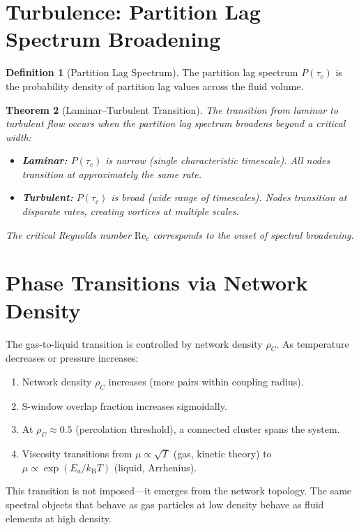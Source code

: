 \documentclass[twocolumn,10pt,a4paper]{article}
\theoremstyle{plain}
\newtheorem{theorem}{Theorem}[section]
\theoremstyle{definition}
\newtheorem{definition}[theorem]{Definition}
\theoremstyle{remark}
\newcommand{\kB}{k_{\mathrm{B}}}
\newcommand{\tauc}{\tau_c}
\begin{document}
\section{Turbulence: Partition Lag Spectrum Broadening}
\label{sec:turbulence}

\begin{definition}[Partition Lag Spectrum]
\label{def:lag_spectrum}
The partition lag spectrum $P(\tauc)$ is the probability density of partition lag values across the fluid volume.
\end{definition}

\begin{theorem}[Laminar--Turbulent Transition]
\label{thm:turbulence}
The transition from laminar to turbulent flow occurs when the partition lag spectrum broadens beyond a critical width:
\begin{itemize}
    \item \textbf{Laminar:} $P(\tauc)$ is narrow (single characteristic timescale). All nodes transition at approximately the same rate.
    \item \textbf{Turbulent:} $P(\tauc)$ is broad (wide range of timescales). Nodes transition at disparate rates, creating vortices at multiple scales.
\end{itemize}
The critical Reynolds number $\mathrm{Re}_c$ corresponds to the onset of spectral broadening.
\end{theorem}

\section{Phase Transitions via Network Density}
\label{sec:phase_transition}

The gas-to-liquid transition is controlled by network density $\rho_C$. As temperature decreases or pressure increases:
\begin{enumerate}
    \item Network density $\rho_C$ increases (more pairs within coupling radius).
    \item S-window overlap fraction increases sigmoidally.
    \item At $\rho_C \approx 0.5$ (percolation threshold), a connected cluster spans the system.
    \item Viscosity transitions from $\mu \propto \sqrt{T}$ (gas, kinetic theory) to $\mu \propto \exp(E_a/\kB T)$ (liquid, Arrhenius).
\end{enumerate}

This transition is not imposed---it emerges from the network topology. The same spectral objects that behave as gas particles at low density behave as fluid elements at high density.
\end{document}
